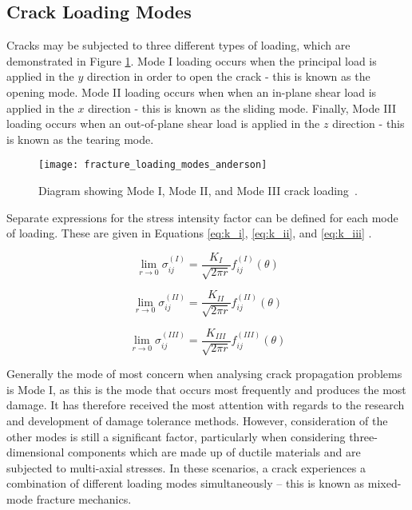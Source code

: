 \newpage
\subsection{Crack Loading Modes}

Cracks may be subjected to three different types of loading, which are demonstrated in Figure \ref{fig:fracture_loading_modes_anderson}. Mode I loading occurs when the principal load is applied in the $y$ direction in order to open the crack - this is known as the opening mode. Mode II loading occurs when when an in-plane shear load is applied in the $x$ direction - this is known as the sliding mode. Finally, Mode III loading occurs when an out-of-plane shear load is applied in the $z$ direction - this is known as the tearing mode.

\begin{figure}[H]
	\centering
	\texttt{[image: fracture\_loading\_modes\_anderson]}
	\caption{Diagram showing Mode I, Mode II, and Mode III crack loading\ \cite{anderson_fracture_2017}.}
	\label{fig:fracture_loading_modes_anderson}
\end{figure}

Separate expressions for the stress intensity factor can be defined for each mode of loading. These are given in Equations \ref{eq:k_i}, \ref{eq:k_ii}, and \ref{eq:k_iii} \cite{anderson_fracture_2017}.

\begin{equation}
	\lim_{r \rightarrow 0} \sigma_{ij}^{(I)} = \frac{K_{I}}{\sqrt{2 \pi r}} f_{ij}^{(I)} (\theta)
	\label{eq:k_i}
\end{equation}

\begin{equation}
	\lim_{r \rightarrow 0} \sigma_{ij}^{(II)} = \frac{K_{II}}{\sqrt{2 \pi r}} f_{ij}^{(II)} (\theta)
	\label{eq:k_ii}
\end{equation}

\begin{equation}
	\lim_{r \rightarrow 0} \sigma_{ij}^{(III)} = \frac{K_{III}}{\sqrt{2 \pi r}} f_{ij}^{(III)} (\theta)
	\label{eq:k_iii}
\end{equation}

Generally the mode of most concern when analysing crack propagation problems is Mode I, as this is the mode that occurs most frequently and produces the most damage. It has therefore received the most attention with regards to the research and development of damage tolerance methods. However, consideration of the other modes is still a significant factor, particularly when considering three-dimensional components which are made up of ductile materials and are subjected to multi-axial stresses. In these scenarios, a crack experiences a combination of different loading modes simultaneously -- this is known as mixed-mode fracture mechanics.

